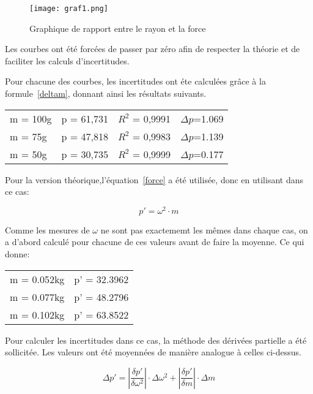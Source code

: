 \begin{figure}[!h]
    \caption[Graphique rayon force]{Graphique de rapport entre le rayon et la force}
    \centering
    \texttt{[image: graf1.png]}
\end{figure}

Les courbes ont été forcées de passer par zéro afin de respecter la théorie et de faciliter les calculs d'incertitudes.

Pour chacune des courbes, les incertitudes ont éte calculées grâce à la formule~\eqref{deltam}, donnant ainsi les résultats suivants.

\begin{table}[ht]
    \centering
    \begin{tabular}{l l l l}
    m = 100g & p = 61,731 & $R^2$ = 0,9991 & $\Delta p$=1.069\\
    m = 75g  & p = 47,818 & $R^2$ = 0,9983 & $\Delta p$=1.139\\
    m = 50g  & p = 30,735 & $R^2$ = 0,9999 & $\Delta p$=0.177\\
    \end{tabular}
\end{table}

Pour la version théorique,l'équation~\eqref{force} a été utilisée, donc en utilisant dans ce cas:

\begin{equation}
    p' = \omega^2 \cdot m
\end{equation}

Comme les mesures de $\omega$ ne sont pas exactememt les mêmes dans chaque cas, on a d'abord calculé pour chacune de ces valeurs avant de faire la moyenne. Ce qui donne:

\begin{table}[ht]
    \centering
    \begin{tabular}{l l}
	m = 0.052kg & p' = 32.3962\\
	m = 0.077kg & p' = 48.2796\\
	m = 0.102kg & p' = 63.8522\\
    \end{tabular}
\end{table}

Pour calculer les incertitudes dans ce cas, la méthode des dérivées partielle a été sollicitée. Les valeurs ont été moyennées de manière analogue à celles ci-dessus.

\begin{equation}
    \Delta p' = |\frac{\delta p'}{\delta \omega^2}|\cdot \Delta \omega^2 + |\frac{\delta p'}{\delta m}|\cdot \Delta m
\end{equation}

